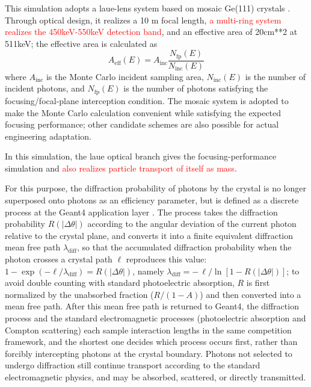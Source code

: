 \documentclass[pdflatex,sn-mathphys-num]{sn-jnl}
\begin{document}
This simulation adopts a laue-lens system based on mosaic Ge(111) crystals \cite{Barriere2009Laue,Barriere2011LauePrototype}. Through optical design, it realizes a 10 m focal length, \textcolor{red}{a multi-ring system realizes the 450keV-550keV detection band}, and an effective area of 20cm**2 at 511keV; the effective area is calculated as
\begin{equation}
  A_{\mathrm{eff}}(E)=A_{\mathrm{inc}}\frac{N_{\mathrm{fp}}(E)}{N_{\mathrm{inc}}(E)}
  \label{eq:laue_aeff}
\end{equation}
where $A_{\mathrm{inc}}$ is the Monte Carlo incident sampling area, $N_{\mathrm{inc}}(E)$ is the number of incident photons, and $N_{\mathrm{fp}}(E)$ is the number of photons satisfying the focusing/focal-plane interception condition.
The mosaic system is adopted to make the Monte Carlo calculation convenient while satisfying the expected focusing performance; other candidate schemes are also possible for actual engineering adaptation.

In this simulation, the laue optical branch gives the focusing-performance simulation and \textcolor{red}{also realizes particle transport of itself as mass}.

For this purpose, the diffraction probability of photons by the crystal is no longer superposed onto photons as an efficiency parameter, but is defined as a discrete process at the Geant4 application layer \cite{Agostinelli2003,Allison2016}. The process takes the diffraction probability $R(|\Delta\theta|)$ according to the angular deviation of the current photon relative to the crystal plane, and converts it into a finite equivalent diffraction mean free path $\lambda_{\mathrm{diff}}$, so that the accumulated diffraction probability when the photon crosses a crystal path $\ell$ reproduces this value: $1-\exp(-\ell/\lambda_{\mathrm{diff}})=R(|\Delta\theta|)$, namely $\lambda_{\mathrm{diff}}=-\,\ell/\ln[1-R(|\Delta\theta|)]$; to avoid double counting with standard photoelectric absorption, $R$ is first normalized by the unabsorbed fraction ($R/(1-A)$) and then converted into a mean free path. After this mean free path is returned to Geant4, the diffraction process and the standard electromagnetic processes (photoelectric absorption and Compton scattering) each sample interaction lengths in the same competition framework, and the shortest one decides which process occurs first, rather than forcibly intercepting photons at the crystal boundary. Photons not selected to undergo diffraction still continue transport according to the standard electromagnetic physics, and may be absorbed, scattered, or directly transmitted.
\end{document}
